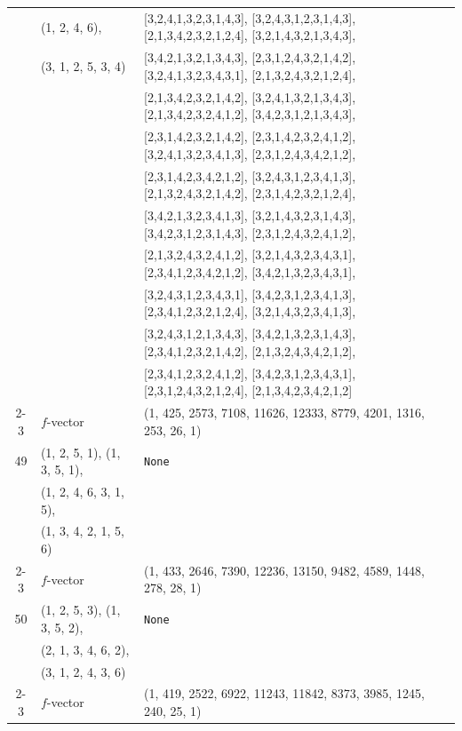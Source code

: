 \documentclass[10pt]{amsart}
\numberwithin{equation}{section}
\theoremstyle{plain}
\theoremstyle{definition}
\theoremstyle{remark}
\begin{document}
{\begin{longtable}{c|l|l}
		& (1, 2, 4, 6), & [3,2,4,1,3,2,3,1,4,3], [3,2,4,3,1,2,3,1,4,3], [2,1,3,4,2,3,2,1,2,4], [3,2,1,4,3,2,1,3,4,3], \\
		& (3, 1, 2, 5, 3, 4) & [3,4,2,1,3,2,1,3,4,3], [2,3,1,2,4,3,2,1,4,2], [3,2,4,1,3,2,3,4,3,1], [2,1,3,2,4,3,2,1,2,4], \\
		&  & [2,1,3,4,2,3,2,1,4,2], [3,2,4,1,3,2,1,3,4,3], [2,1,3,4,2,3,2,4,1,2], [3,4,2,3,1,2,1,3,4,3], \\
		&  & [2,3,1,4,2,3,2,1,4,2], [2,3,1,4,2,3,2,4,1,2], [3,2,4,1,3,2,3,4,1,3], [2,3,1,2,4,3,4,2,1,2], \\
		&  & [2,3,1,4,2,3,4,2,1,2], [3,2,4,3,1,2,3,4,1,3], [2,1,3,2,4,3,2,1,4,2], [2,3,1,4,2,3,2,1,2,4], \\
		&  & [3,4,2,1,3,2,3,4,1,3], [3,2,1,4,3,2,3,1,4,3], [3,4,2,3,1,2,3,1,4,3], [2,3,1,2,4,3,2,4,1,2], \\
		&  & [2,1,3,2,4,3,2,4,1,2], [3,2,1,4,3,2,3,4,3,1], [2,3,4,1,2,3,4,2,1,2], [3,4,2,1,3,2,3,4,3,1], \\
		&  & [3,2,4,3,1,2,3,4,3,1], [3,4,2,3,1,2,3,4,1,3], [2,3,4,1,2,3,2,1,2,4], [3,2,1,4,3,2,3,4,1,3], \\
		&  & [3,2,4,3,1,2,1,3,4,3], [3,4,2,1,3,2,3,1,4,3], [2,3,4,1,2,3,2,1,4,2], [2,1,3,2,4,3,4,2,1,2], \\
		&  & [2,3,4,1,2,3,2,4,1,2], [3,4,2,3,1,2,3,4,3,1], [2,3,1,2,4,3,2,1,2,4], [2,1,3,4,2,3,4,2,1,2] \\ \cline{2-3}
		
		& $f$-vector & {(1, 425, 2573, 7108, 11626, 12333, 8779, 4201, 1316, 253, 26, 1)} \\
		\midrule
		
		49 & (1, 2, 5, 1), (1, 3, 5, 1), & \texttt{None} \\
		& (1, 2, 4, 6, 3, 1, 5), &  \\
		& (1, 3, 4, 2, 1, 5, 6) &  \\ \cline{2-3}
		
		& $f$-vector & {(1, 433, 2646, 7390, 12236, 13150, 9482, 4589, 1448, 278, 28, 1)} \\
		\midrule
		
		50 & (1, 2, 5, 3), (1, 3, 5, 2), & \texttt{None} \\
		& (2, 1, 3, 4, 6, 2), &  \\
		& (3, 1, 2, 4, 3, 6) &  \\ \cline{2-3}
		
		& $f$-vector & {(1, 419, 2522, 6922, 11243, 11842, 8373, 3985, 1245, 240, 25, 1)} \\
		\midrule
		

\end{longtable}}
\end{document}
